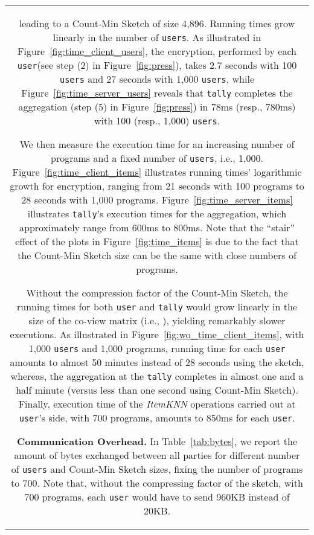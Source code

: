 \documentclass[conference]{IEEEtran}
\newcommand{\descr}[1]{\medskip \noindent \textbf{#1}}
\newcommand{\user}{{\tt user}\xspace}
\newcommand{\users}{{\tt users}\xspace}
\newcommand{\tally}{{\tt tally}\xspace}
\begin{document}
\begin{figure*}[ht!]
{\begin{tabular}{|c|}
leading to a Count-Min Sketch of size  4,896. 
Running times grow linearly in the number of \users. 
As illustrated in Figure~\ref{fig:time_client_users}, the encryption, performed by each \user (see step (2) in Figure~\ref{fig:press}), takes 2.7 seconds with 100 \users and 27 seconds with 1,000 \users, while
Figure~\ref{fig:time_server_users} reveals that \tally completes the aggregation (step (5) in Figure~\ref{fig:press}) in 78ms (resp., 780ms) with 100  (resp., 1,000) \users.




We then measure the execution time for an increasing number of programs and a fixed number of \users, i.e., 1,000.
Figure~\ref{fig:time_client_items} illustrates running times' logarithmic growth for encryption, ranging from 21 seconds with 100 programs to 28 seconds with 1,000 programs. Figure~\ref{fig:time_server_items} illustrates \tally's execution times for the aggregation, which approximately range from 600ms to 800ms.
Note that the ``stair'' effect of the plots in Figure~\ref{fig:time_items} is due to the fact that the Count-Min Sketch size can be the same with close numbers of programs.

Without the compression factor of the Count-Min Sketch, the running times for both \user and \tally would grow linearly in the size of the co-view matrix  (i.e., ), yielding remarkably slower executions. As illustrated in Figure~\ref{fig:wo_time_client_items}, with 1,000 \users and 1,000 programs, running time for each \user amounts to almost 50 minutes instead of 28 seconds using the sketch, whereas, the aggregation at the \tally completes in almost one and a half minute (versus less than one second using Count-Min Sketch). 
Finally, execution time of the \emph{ItemKNN} operations carried out at \user's side, with 700 programs, amounts to 850ms for each \user.








\descr{Communication Overhead.} In Table~\ref{tab:bytes}, we report the amount of bytes exchanged between all parties for different number of \users and Count-Min Sketch sizes, fixing the number of programs to 700.
Note that, without the compressing factor of the sketch, with 700 programs, each \user would have to send 960KB instead of 20KB.




\end{tabular}}
\end{figure*}
\end{document}
